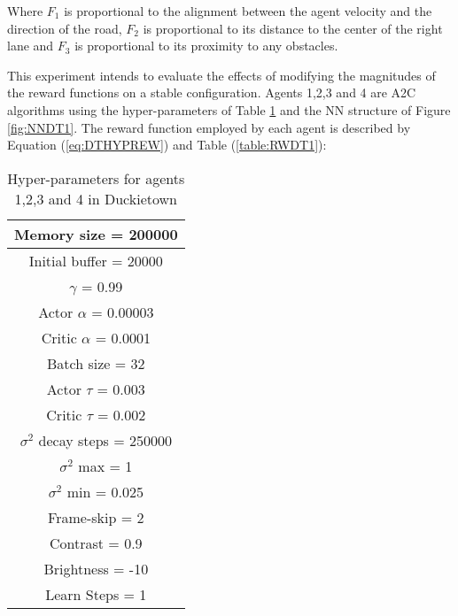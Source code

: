 \documentclass[journal]{IEEEtran}
\begin{document}
	Where $F_1$ is proportional to the alignment between the agent velocity and the direction of the road, $F_2$ is proportional to its distance to the center of the right lane and $F_3$ is proportional to its proximity to any obstacles.
	
	This experiment intends to evaluate the effects of modifying the magnitudes of the reward functions on a stable configuration. Agents 1,2,3 and 4 are A2C algorithms using the hyper-parameters of Table \ref{table:HPDT1} and the NN structure of Figure \ref{fig:NNDT1}. The reward function employed by each agent is described by Equation (\ref{eq:DTHYPREW}) and Table (\ref{table:RWDT1}):
		
	\begin{table}[hbt!]
	\centering
			
		\begin{tabular}{c}
			
			Memory size = 200000\\
					
			\hline
			Initial buffer = 20000\\
					
			\hline
			$\gamma$ = 0.99\\
				
			\hline
			Actor $\alpha$ = 0.00003\\
					
			\hline
			Critic $\alpha$ = 0.0001\\
					
			\hline
			Batch size = 32\\
				
			\hline
			Actor $\tau$ = 0.003\\
					
			\hline
			Critic $\tau$ = 0.002\\
					
			\hline
			$\sigma^2$ decay steps  = 250000\\
			
			\hline
			$\sigma^2$ max = 1\\
					
			\hline
			$\sigma^2$ min = 0.025\\

			\hline
			Frame-skip = 2\\
					
			\hline
			Contrast = 0.9\\
					
			\hline
			Brightness = -10\\
					
			\hline
			Learn Steps = 1\\
			
		\end{tabular}
			
	\caption{Hyper-parameters for agents 1,2,3 and 4 in Duckietown}
	\label{table:HPDT1}
	\end{table}
			
\end{document}
